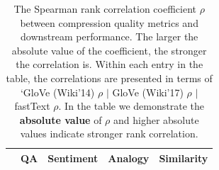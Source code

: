 \begin{table}
	\caption{The Spearman rank correlation coefficient $\rho$ between compression quality metrics and downstream performance. The larger the absolute value of the coefficient, the stronger the correlation is.
	Within each entry in the table, the correlations are presented in terms of `GloVe (Wiki'14) $\rho$ \; $|$ \; GloVe (Wiki'17) $\rho$ \; $|$ \; fastText $\rho$. In the table we demonstrate the \textbf{absolute value} of $\rho$ and higher absolute values indicate stronger rank correlation.
	}
	\small
	\centering
	\begin{tabular}{c | c | c | c | c | c | c | c | c | c | c | c | c}
		\toprule
		& \multicolumn{3}{|c|}{QA} & \multicolumn{3}{|c|}{Sentiment} & \multicolumn{3}{|c|}{Analogy} & \multicolumn{3}{|c}{Similarity} \\
		\midrule

\end{tabular}
\end{table}
